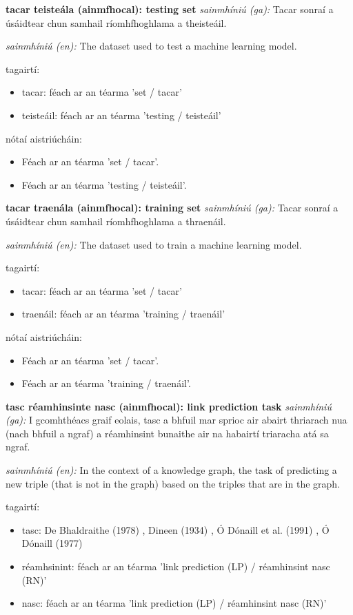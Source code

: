 \documentclass{article}
\begin{document}
\textbf{tacar teisteála (ainmfhocal): testing set}
\textit{sainmhíniú (ga):} Tacar sonraí a úsáidtear chun samhail ríomhfhoghlama a theisteáil.

\textit{sainmhíniú (en):} The dataset used to test a machine learning model.

tagairtí:
\begin{itemize}
	\item tacar: féach ar an téarma 'set / tacar'
	\item teisteáil: féach ar an téarma 'testing / teisteáil'
\end{itemize}

nótaí aistriúcháin:
\begin{itemize}
	\item Féach ar an téarma 'set / tacar'.
	\item Féach ar an téarma 'testing / teisteáil'.
\end{itemize}


\textbf{tacar traenála (ainmfhocal): training set}
\textit{sainmhíniú (ga):} Tacar sonraí a úsáidtear chun samhail ríomhfhoghlama a thraenáil.

\textit{sainmhíniú (en):} The dataset used to train a machine learning model.

tagairtí:
\begin{itemize}
	\item tacar: féach ar an téarma 'set / tacar'
	\item traenáil: féach ar an téarma 'training / traenáil'
\end{itemize}

nótaí aistriúcháin:
\begin{itemize}
	\item Féach ar an téarma 'set / tacar'.
	\item Féach ar an téarma 'training / traenáil'.
\end{itemize}


\textbf{tasc réamhinsinte nasc (ainmfhocal): link prediction task}
\textit{sainmhíniú (ga):} I gcomhthéacs graif eolais, tasc a bhfuil mar sprioc air abairt thriarach nua (nach bhfuil a ngraf) a réamhinsint bunaithe air na habairtí triaracha atá sa ngraf.

\textit{sainmhíniú (en):} In the context of a knowledge graph, the task of predicting a new triple (that is not in the graph) based on the triples that are in the graph.

tagairtí:
\begin{itemize}
	\item tasc: De Bhaldraithe (1978) \cite{de-bhaldraithe}, Dineen (1934) \cite{dineen}, Ó Dónaill et al. (1991) \cite{focloir-beag}, Ó Dónaill (1977) \cite{odonaill}
	\item réamhsinint: féach ar an téarma 'link prediction (LP) / réamhinsint nasc (RN)'
	\item nasc: féach ar an téarma 'link prediction (LP) / réamhinsint nasc (RN)'
\end{itemize}
\end{document}
